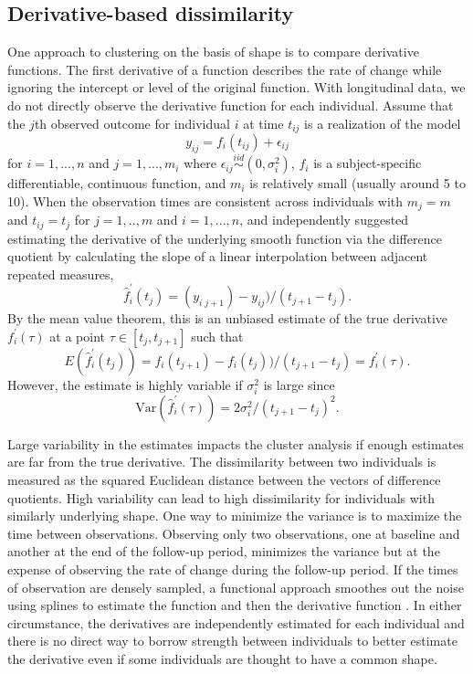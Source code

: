 \subsection{Derivative-based dissimilarity}
One approach to clustering on the basis of shape is to compare derivative functions. The first derivative of a function describes the rate of change while ignoring the intercept or level of the original function. With longitudinal data, we do not directly observe the derivative function for each individual. Assume that the $j$th observed outcome for individual $i$ at time $t_{ij}$ is a realization of the model
$$y_{ij}= f_i(t_{ij})+\epsilon_{ij}$$
for $i=1,...,n$ and $j=1,...,m_{i}$ where $\epsilon_{ij}\overset{iid}{\sim} (0,\sigma_{i}^{2})$, $f_{i}$ is a subject-specific differentiable, continuous function, and $m_{i}$ is relatively small (usually around 5 to 10). When the observation times are consistent across individuals with $m_{j}=m$ and $t_{ij} = t_{j}$ for $j=1,..,m$ and $i=1,...,n$, \Textcite{moller2003} and \textcite{d2000} independently suggested estimating the derivative of the underlying smooth function via the difference quotient by calculating the slope of a linear interpolation between adjacent repeated measures,
$$\hat{f}_{i}^{'}(t_{j}) = (y_{i\;j+1})-y_{ij})/(t_{j+1}-t_j).$$
By the mean value theorem, this is an unbiased estimate of the true derivative $f_{i}^{'}(\tau)$ at a point $\tau\in[t_{j},t_{j+1}]$ such that
$$E(\hat{f}_{i}^{'}(t_{j})) = f_i(t_{j+1})-f_i(t_j))/(t_{j+1}-t_j) =f_{i}^{'}(\tau). $$
However, the estimate is highly variable if $\sigma_{i}^{2}$ is large since
$$\text{Var}(\hat{f}_{i}^{'}(\tau)) =  2\sigma^{2}_{i}/ (t_{j+1}-t_j)^{2}.$$

Large variability in the estimates impacts the cluster analysis if enough estimates are far from the true derivative. The dissimilarity between two individuals is measured as the squared Euclidean distance between the vectors of difference quotients. High variability can lead to high dissimilarity for individuals with similarly underlying shape. One way to minimize the variance is to maximize the time between observations. Observing only two observations, one at baseline and another at the end of the follow-up period, minimizes the variance but at the expense of observing the rate of change during the follow-up period. If the times of observation are densely sampled, a functional approach smoothes out the noise using splines to estimate the function and then the derivative function \cite{tarpey2003}. In either circumstance, the derivatives are independently estimated for each individual and there is no direct way to borrow strength between individuals to better estimate the derivative even if some individuals are thought to have a common shape.

